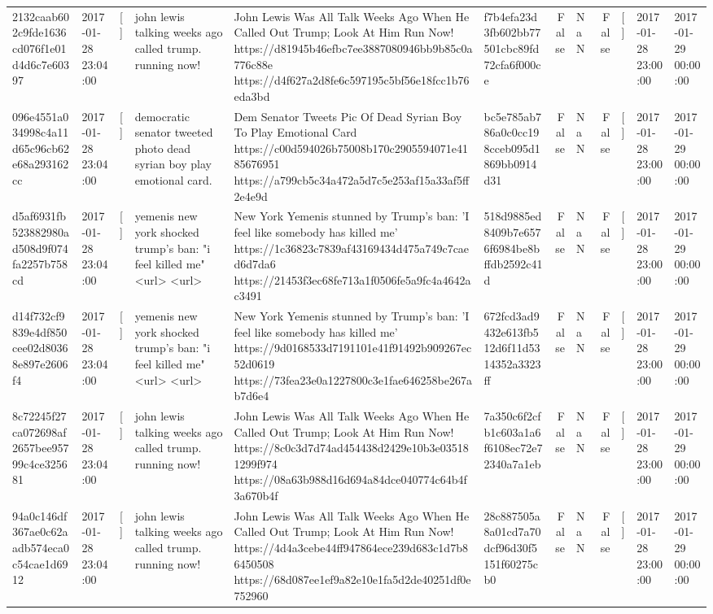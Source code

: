 \begin{tabular}{llllllrlrlll}
2132caab602c9fde1636cd076f1e01d4d6c7e60397 & 2017-01-28 23:04:00 & [] & john lewis talking weeks ago called trump. running now! & John Lewis Was All Talk Weeks Ago When He Called Out Trump; Look At Him Run Now! https://d81945b46efbc7ee3887080946bb9b85c0a776c88e https://d4f627a2d8fe6c597195c5bf56e18fcc1b76eda3bd & f7b4efa23d3fb602bb77501cbc89fd72cfa6f000ce & False & NaN & False & [] & 2017-01-28 23:00:00 & 2017-01-29 00:00:00 \\
096e4551a034998c4a11d65c96cb62e68a293162cc & 2017-01-28 23:04:00 & [] & democratic senator tweeted photo dead syrian boy play emotional card. & Dem Senator Tweets Pic Of Dead Syrian Boy To Play Emotional Card https://c00d594026b75008b170c2905594071e4185676951 https://a799cb5c34a472a5d7c5e253af15a33af5ff2e4e9d & bc5e785ab786a0c0cc198cceb095d1869bb0914d31 & False & NaN & False & [] & 2017-01-28 23:00:00 & 2017-01-29 00:00:00 \\
d5af6931fb523882980ad508d9f074fa2257b758cd & 2017-01-28 23:04:00 & [] & yemenis new york shocked trump's ban: "i feel killed me" <url> <url> & New York Yemenis stunned by Trump's ban: 'I feel like somebody has killed me' https://1c36823c7839af43169434d475a749c7caed6d7da6 https://21453f3ec68fe713a1f0506fe5a9fc4a4642ac3491 & 518d9885ed8409b7e6576f6984be8bffdb2592c41d & False & NaN & False & [] & 2017-01-28 23:00:00 & 2017-01-29 00:00:00 \\
d14f732cf9839e4df850cee02d80368e897e2606f4 & 2017-01-28 23:04:00 & [] & yemenis new york shocked trump's ban: "i feel killed me" <url> <url> & New York Yemenis stunned by Trump's ban: 'I feel like somebody has killed me' https://9d0168533d7191101e41f91492b909267ec52d0619 https://73fea23e0a1227800c3e1fae646258be267ab7d6e4 & 672fcd3ad9432e613fb512d6f11d5314352a3323ff & False & NaN & False & [] & 2017-01-28 23:00:00 & 2017-01-29 00:00:00 \\
8c72245f27ca072698af2657bee95799c4ce325681 & 2017-01-28 23:04:00 & [] & john lewis talking weeks ago called trump. running now! & John Lewis Was All Talk Weeks Ago When He Called Out Trump; Look At Him Run Now! https://8c0c3d7d74ad454438d2429e10b3e035181299f974 https://08a63b988d16d694a84dce040774c64b4f3a670b4f & 7a350c6f2cfb1c603a1a6f6108ec72e72340a7a1eb & False & NaN & False & [] & 2017-01-28 23:00:00 & 2017-01-29 00:00:00 \\
94a0c146df367ae0c62aadb574eca0c54cae1d6912 & 2017-01-28 23:04:00 & [] & john lewis talking weeks ago called trump. running now! & John Lewis Was All Talk Weeks Ago When He Called Out Trump; Look At Him Run Now! https://4d4a3cebe44ff947864ece239d683c1d7b86450508 https://68d087ee1ef9a82e10e1fa5d2de40251df0e752960 & 28c887505a8a01cd7a70dcf96d30f5151f60275cb0 & False & NaN & False & [] & 2017-01-28 23:00:00 & 2017-01-29 00:00:00 \\

\end{tabular}
